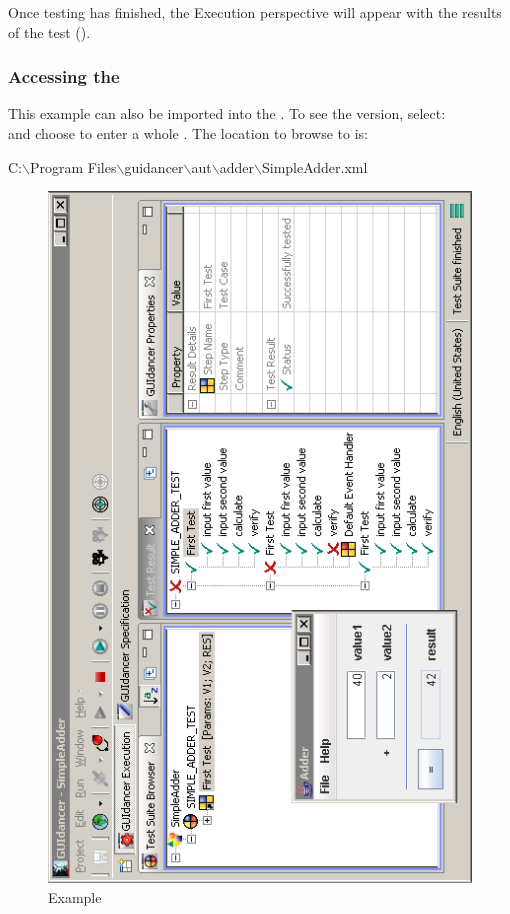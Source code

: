 
 Once testing has finished,
the Execution perspective will appear with the results of the test
 (). 

\subsubsection{Accessing the \gdproject}
This example \gdproject can also be imported into the \gddb{}.
To see the \bredex version, select:\\
 and choose to enter a whole \gdproject{}. The 
location to browse to is: 

C:$\backslash$Program Files$\backslash$guidancer$\backslash$aut$\backslash$adder$\backslash$SimpleAdder.xml
\begin{figure}[h]
\includegraphics{GettingStarted/PS/Execution}
\caption{Example \gdsuite}
\label{Testshot}
\end{figure}


